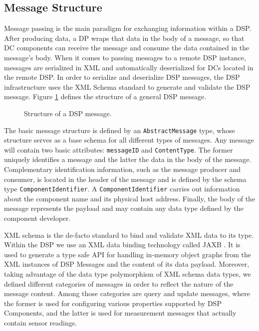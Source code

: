 \documentclass[conference]{IEEEtran}
\begin{document}
\subsection{Message Structure}

Message passing is the main paradigm for exchanging information within
a DSP. After producing data, a DP wraps that data in the body
of a message, so that DC components can receive the message and
consume the data contained in the message's body. When it comes to passing
messages to a remote DSP instance, messages are serialized in XML
\cite{xml2000} and automatically deserialized for DCs located in the
remote DSP. In order to serialize and deserialize DSP messages, the
DSP infrastructure uses the XML Schema standard \cite{xml-schema2004}
to generate and validate the DSP message. Figure \ref{FIG_DSP_MESSAGE}
defines the structure of a general DSP message.

\begin{figure}[!htb]
 \centering
 \caption{\label{FIG_DSP_MESSAGE} Structure of a DSP message.}
\end{figure}

The basic message structure is defined by an \texttt{AbstractMessage}
type, whose structure serves as a base schema for all different types
of messages. Any message will contain two basic attributes:
\texttt{messageID} and \texttt{ContentType}.  The former uniquely
identifies a message and the latter the data in the body of the
message. Complementary identification information, such as the message
producer and consumer, is located in the header of the message and 
is defined by the schema type \texttt{ComponentIdentifier}. A
\texttt{ComponentIdentifier} carries out information about the
component name and its physical host address.  Finally, the body of
the message represents the payload and may contain any data type
defined by the component developer.

XML schema is the de-facto standard to bind and validate XML
data to its type. Within the DSP we use an XML
data binding technology \cite{xml-dbind} called JAXB \cite{xml-jaxb}.
It is used to generate a type safe API for handling in-memory object
graphs from the XML instances of DSP Messages and the content of its
data payload. Moreover, taking advantage of the data type polymorphism
of XML schema data types, we defined different categories of messages in order to
reflect the nature of the message content. Among those categories are
query and update messages, where the former is used for configuring various
properties supported by DSP Components, and the latter is used for measurement
messages that actually contain sensor readings.
\end{document}
